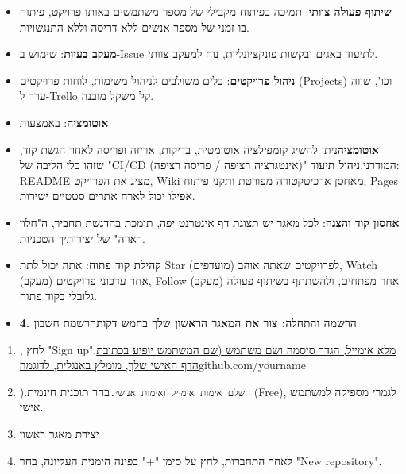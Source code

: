 \begin{itemize}
  \item \textbf{שיתוף פעולה צוותי}: תמיכה בפיתוח מקבילי של מספר משתמשים באותו פרויקט, פיתוח בו-זמני של מספר אנשים ללא דריסה וללא התנגשויות.
  \item \textbf{מעקב בעיות}: שימוש ב-Issue לתיעוד באגים ובקשות פונקציונליות, נוח למעקב צוותי.
  \item \textbf{ניהול פרויקטים}: כלים משולבים לניהול משימות, לוחות פרויקטים (Projects) וכו', שווה ערך ל-Trello קל משקל מובנה.
  \item \textbf{אוטומציה}: באמצעות
  \item \textbf{אוטומציה}ניתן להשיג קומפילציה אוטומטית, בדיקות, אריזה ופריסה לאחר הגשת קוד, שזהו כלי הליבה של "CI/CD (אינטגרציה רציפה / פריסה רציפה)" המודרני.\textbf{ניהול תיעוד}: README מציג את הפרויקט, Wiki מאחסן ארכיטקטורה מפורטת ותקני פיתוח, Pages אפילו יכול לארח אתרים סטטיים ישירות.
  \item \textbf{אחסון קוד והצגה}: לכל מאגר יש תצוגת דף אינטרנט יפה, תומכת בהדגשת תחביר, ה"חלון ראווה" של יצירותיך הטכניות.
  \item \textbf{קהילת קוד פתוח}: אתה יכול לתת Star (מועדפים) לפרויקטים שאתה אוהב, Watch (מעקב) אחר עדכוני פרויקטים, Follow (מעקב) אחר מפתחים, ולהשתתף בשיתוף פעולה גלובלי בקוד פתוח.
  \item \textbf{4. הרשמה והתחלה: צור את המאגר הראשון שלך בחמש דקות}הרשמת חשבון
\end{itemize}



\begin{enumerate}
  \item , לחץ "Sign up".\href{https://github.com}{מלא אימייל, הגדר סיסמה ושם משתמש (שם המשתמש יופיע בכתובת הדף האישי שלך, מומלץ באנגלית, לדוגמה}github.com/yourname
  \item ).\texttt{השלם אימות אימייל ואימות אנושי.\allowbreak }בחר תוכנית חינמית (Free), לגמרי מספיקה למשתמש אישי.
  \item יצירת מאגר ראשון
  \item לאחר התחברות, לחץ על סימן "+" בפינה הימנית העליונה, בחר "New repository".
\end{enumerate}


